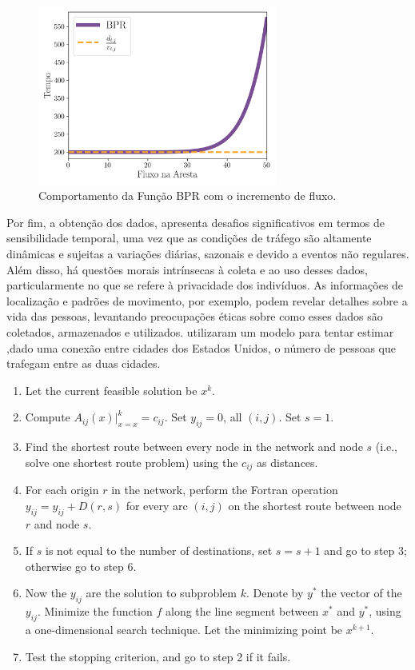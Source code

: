 \documentclass{article}
\begin{document}
\begin{figure}[H]
    \centering
    \includegraphics[width=0.7\textwidth]{img/BPR.png}
    \caption{Comportamento da Função BPR com o incremento de fluxo.}
    \label{fig:BPR}
\end{figure}


Por fim, a obtenção dos dados, apresenta desafios significativos em termos de sensibilidade temporal, uma vez que as condições de tráfego são altamente dinâmicas e sujeitas a variações diárias, sazonais e devido a eventos não regulares. Além disso, há questões morais intrínsecas à coleta e ao uso desses dados, particularmente no que se refere à privacidade dos indivíduos. As informações de localização e padrões de movimento, por exemplo, podem revelar detalhes sobre a vida das pessoas, levantando preocupações éticas sobre como esses dados são coletados, armazenados e utilizados. \citet{Simini2012} utilizaram um modelo para tentar estimar ,dado uma conexão entre cidades dos Estados Unidos, o número de pessoas que trafegam entre as duas cidades.

\begin{enumerate}
    \item Let the current feasible solution be \( x^k \).
    \item Compute \( A_{ij}(x) |_{x = x}^k = c_{ij} \). Set \( y_{ij} = 0 \), all \( (i, j) \). Set \( s = 1 \).
    \item Find the shortest route between every node in the network and node \( s \) (i.e., solve one shortest route problem) using the \( c_{ij} \) as distances.
    \item For each origin \( r \) in the network, perform the Fortran operation \( y_{ij} = y_{ij} + D(r, s) \) for every arc \( (i, j) \) on the shortest route between node \( r \) and node \( s \).
    \item If \( s \) is not equal to the number of destinations, set \( s = s + 1 \) and go to step 3; otherwise go to step 6.
    \item Now the \( y_{ij} \) are the solution to subproblem \( k \). Denote by \( y^* \) the vector of the \( y_{ij} \). Minimize the function \( f \) along the line segment between \( x^* \) and \( y^* \), using a one-dimensional search technique. Let the minimizing point be \( x^{k+1} \).
    \item Test the stopping criterion, and go to step 2 if it fails.
\end{enumerate}
\end{document}
